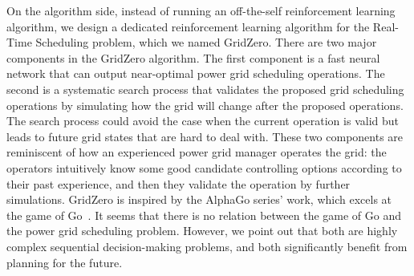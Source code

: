 
On the algorithm side, 
instead of running an off-the-self reinforcement learning algorithm, we design a dedicated reinforcement learning algorithm for the Real-Time Scheduling problem, which we named GridZero. There are two major components in the GridZero algorithm. The first component is a fast neural network that can output near-optimal power grid scheduling operations. The second is a systematic search process that validates the proposed grid scheduling operations by simulating how the grid will change after the proposed operations. The search process could avoid the case when the current operation is valid but leads to future grid states that are hard to deal with. These two components are reminiscent of how an experienced power grid manager operates the grid: the operators intuitively know some good candidate controlling options according to their past experience, and then they validate the operation by further simulations. GridZero is inspired by the AlphaGo series' work, which excels at the game of Go~\cite{silver2016mastering,li2018alphago,silver2017mastering,schrittwieser2020mastering}. It seems that there is no relation between the game of Go and the power grid scheduling problem. However, we point out that both are highly complex sequential decision-making problems, and both significantly benefit from planning for the future. 

